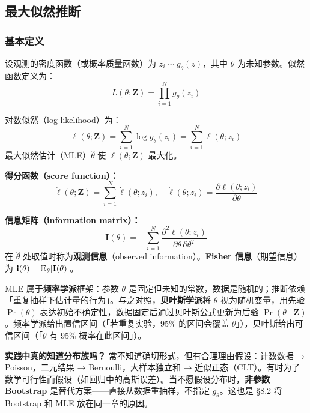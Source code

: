 \subsection{最大似然推断}

\subsubsection{基本定义}

设观测的密度函数（或概率质量函数）为 $z_i \sim g_\theta(z)$，其中 $\theta$ 为未知参数。似然函数定义为：
\begin{equation}\label{eq:likelihood}
    L(\theta; \mathbf{Z}) = \prod_{i=1}^{N} g_\theta(z_i)
\end{equation}

对数似然（log-likelihood）为：
\begin{equation}\label{eq:loglik}
    \ell(\theta; \mathbf{Z}) = \sum_{i=1}^{N} \log g_\theta(z_i) = \sum_{i=1}^{N} \ell(\theta; z_i)
\end{equation}
最大似然估计（MLE）$\hat{\theta}$ 使 $\ell(\theta; \mathbf{Z})$ 最大化。

\textbf{得分函数（score function）：}
\begin{equation}\label{eq:score}
    \dot{\ell}(\theta; \mathbf{Z}) = \sum_{i=1}^{N} \dot{\ell}(\theta; z_i),\quad \dot{\ell}(\theta; z_i) = \frac{\partial \ell(\theta; z_i)}{\partial\theta}
\end{equation}

\textbf{信息矩阵（information matrix）：}
\begin{equation}\label{eq:info}
    \mathbf{I}(\theta) = -\sum_{i=1}^{N} \frac{\partial^2 \ell(\theta; z_i)}{\partial\theta\,\partial\theta^T}
\end{equation}
在 $\hat{\theta}$ 处取值时称为\textbf{观测信息}（observed information）。\textbf{Fisher 信息}（期望信息）为 $\mathbf{i}(\theta) = \mathbb{E}_\theta[\mathbf{I}(\theta)]$。

MLE 属于\textbf{频率学派}框架：参数 $\theta$ 是固定但未知的常数，数据是随机的；推断依赖「重复抽样下估计量的行为」。与之对照，\textbf{贝叶斯学派}将 $\theta$ 视为随机变量，用先验 $\Pr(\theta)$ 表达初始不确定性，数据固定后通过贝叶斯公式更新为后验 $\Pr(\theta\mid\mathbf{Z})$。频率学派给出置信区间（「若重复实验，95\% 的区间会覆盖 $\theta$」），贝叶斯给出可信区间（「$\theta$ 有 95\% 概率在此区间」）。

\textbf{实践中真的知道分布族吗？} 常不知道确切形式，但有合理理由假设：计数数据 → Poisson，二元结果 → Bernoulli，大样本独立和 → 近似正态（CLT）。有时为了数学可行性而假设（如回归中的高斯误差）。当不愿假设分布时，\textbf{非参数 Bootstrap} 是替代方案——直接从数据重抽样，不指定 $g_\theta$。这也是 §8.2 将 Bootstrap 和 MLE 放在同一章的原因。

